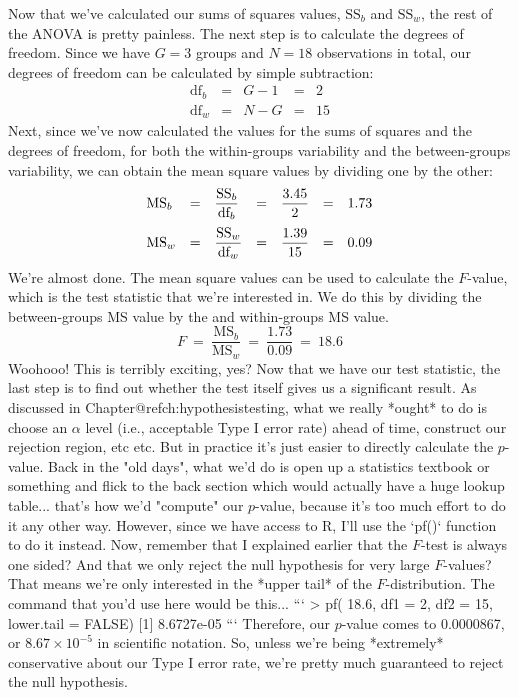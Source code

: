 Now that we've calculated our sums of squares values, $\mbox{SS}_b$ and $\mbox{SS}_w$, the rest of the ANOVA is pretty painless. The next step is to calculate the degrees of freedom. Since we have $G = 3$ groups and $N = 18$ observations in total, our degrees of freedom can be calculated by simple subtraction:
$$
\begin{array}{lclcl}
\mbox{df}_b &=& G - 1 &=& 2 \\
\mbox{df}_w &=& N - G &=& 15 
\end{array}
$$
Next, since we've now calculated the values for the sums of squares and the degrees of freedom, for both the within-groups variability and the between-groups variability, we can obtain the mean square values by dividing one by the other:
$$
\begin{array}{lclclcl}
\mbox{MS}_b &=& \displaystyle\frac{\mbox{SS}_b }{  \mbox{df}_b } &=& \displaystyle\frac{3.45}{ 2}  &=& 1.73 \vspace*{6pt} \\ 
\mbox{MS}_w &=& \displaystyle\frac{\mbox{SS}_w }{  \mbox{df}_w } &=& \displaystyle\frac{1.39}{15} &=& 0.09
\end{array}
$$
We're almost done. The mean square values can be used to calculate the $F$-value, which is the test statistic that we're interested in. We do this by dividing the between-groups MS value by the and within-groups MS value.
$$
F \ = \ \frac{\mbox{MS}_b }{ \mbox{MS}_w } \ = \ \frac{1.73}{0.09} \ = \ 18.6
$$
Woohooo! This is terribly exciting, yes? Now that we have our test statistic, the last step is to find out whether the test itself gives us a significant result. As discussed in Chapter@refch:hypothesistesting, what we really *ought* to do is choose an $\alpha$ level (i.e., acceptable Type I error rate) ahead of time, construct our rejection region, etc etc. But in practice it's just easier to directly calculate the $p$-value. Back in the "old days", what we'd do is open up a statistics textbook or something and flick to the back section which would actually have a huge lookup table... that's how we'd "compute" our $p$-value, because it's too much effort to do it any other way. However, since we have access to R, I'll use the `pf()` function to do it instead. Now, remember that I explained earlier that the $F$-test is always one sided? And that we only reject the null hypothesis for very large $F$-values? That means we're only interested in the *upper tail* of the $F$-distribution. The command that you'd use here would be this...
```
> pf( 18.6, df1 = 2, df2 = 15, lower.tail = FALSE)
[1] 8.6727e-05
```
Therefore, our $p$-value comes to 0.0000867, or $8.67 \times 10^{-5}$ in scientific notation. So, unless we're being *extremely* conservative about our Type I error rate, we're pretty much guaranteed to reject the null hypothesis. 

